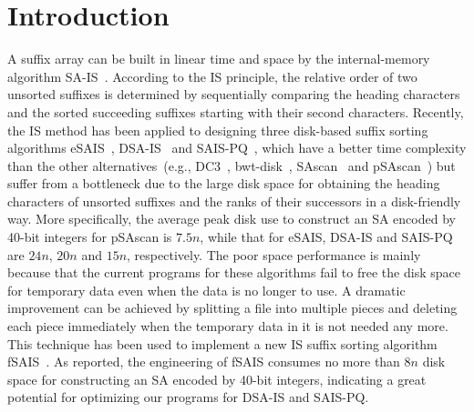 \documentclass[10pt,journal,compsoc]{IEEEtran}
\begin{document}
\IEEEdisplaynontitleabstractindextext

\IEEEpeerreviewmaketitle

\section{Introduction}\label{sec:introduction}

A suffix array can be built in linear time and space by the internal-memory algorithm SA-IS~\cite{Nong11}. According to the IS principle, the relative order of two unsorted suffixes is determined by sequentially comparing the heading characters and the sorted succeeding suffixes starting with their second characters. Recently, the IS method has been applied to designing three disk-based suffix sorting algorithms eSAIS~\cite{Bingmann12}, DSA-IS~\cite{Nong15} and SAIS-PQ~\cite{Liu15}, which have a better time complexity than the other alternatives~(e.g., DC3~\cite{Dementiev2008a}, bwt-disk~\cite{Ferragina2012}, SAscan~\cite{Karkkainen2014} and pSAscan~\cite{Karkkainen2015}) but suffer from a bottleneck due to the large disk space for obtaining the heading characters of unsorted suffixes and the ranks of their successors in a disk-friendly way. More specifically, the average peak disk use to construct an SA encoded by 40-bit integers for pSAscan is $7.5n$, while that for eSAIS, DSA-IS and SAIS-PQ are $24n$, $20n$ and $15n$, respectively. The poor space performance is mainly because that the current programs for these algorithms fail to free the disk space for temporary data even when the data is no longer to use. A dramatic improvement can be achieved by splitting a file into multiple pieces and deleting each piece immediately when the temporary data in it is not needed any more. This technique has been used to implement a new IS suffix sorting algorithm fSAIS~\cite{Karkkainen2017}. As reported, the engineering of fSAIS consumes no more than $8n$ disk space for constructing an SA encoded by 40-bit integers, indicating a great potential for optimizing our programs for DSA-IS and SAIS-PQ. 
\end{document}
